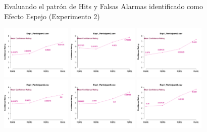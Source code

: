 \begin{figure}[th]
\caption[Rate_Exp2]{Evaluando el patrón de Hits y Falsas Alarmas identificado como Efecto Espejo (Experimento 2)}
\label{fig:Rate_E2}
\end{figure}






\begin{figure}[th]
\centering
\includegraphics[width=0.30\textwidth]{Figures/MirrorRating_Exp1_P1} \includegraphics[width=0.30\textwidth]{Figures/MirrorRating_Exp1_P2} \includegraphics[width=0.30\textwidth]{Figures/MirrorRating_Exp1_P3}
\includegraphics[width=0.30\textwidth]{Figures/MirrorRating_Exp1_P4} \includegraphics[width=0.30\textwidth]{Figures/MirrorRating_Exp1_P5} \includegraphics[width=0.30\textwidth]{Figures/MirrorRating_Exp1_P6}

\end{figure}
